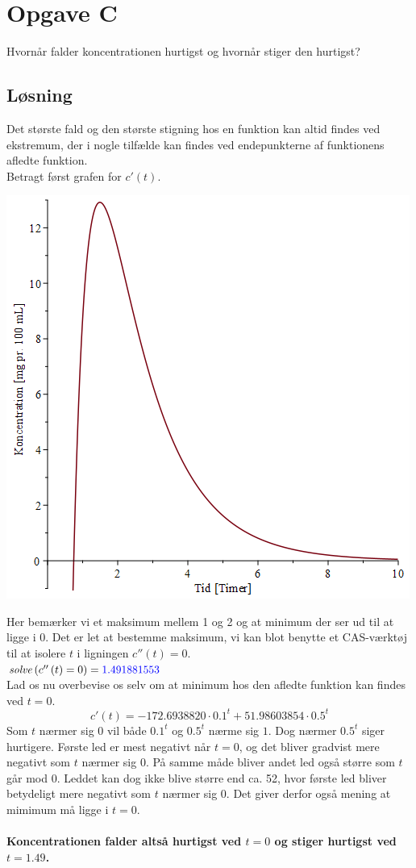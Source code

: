 \documentclass[a4paper, 11pt]{article}
\begin{document}
\section*{Opgave C} 
Hvornår falder koncentrationen hurtigst og hvornår stiger den hurtigst?
\subsection*{Løsning}
Det største fald og den største stigning hos en funktion kan altid findes ved ekstremum, der i nogle tilfælde kan findes ved endepunkterne af funktionens afledte funktion.\\
Betragt først grafen for \(c'(t)\).\\
\begin{center}
\includegraphics[width = 0.65 \textwidth]{AfledtGraf.png}
\end{center}
Her bemærker vi et maksimum mellem 1 og 2 og at minimum der ser ud til at ligge i 0. Det er let at bestemme maksimum, vi kan blot benytte et CAS-værktøj til at isolere \(t\) i ligningen \(c''(t)=0\).\\
\(\mathit{solve}\left(c''\left(t\right)=0\right)=\textcolor{blue}{1.491881553}\)\\
Lad os nu overbevise os selv om at minimum hos den afledte funktion kan findes ved \(t=0\). 
\[c'(t)=- 172.6938820 \cdot 0.1^{t}+ 51.98603854 \cdot 0.5^{t}\]
Som \(t\) nærmer sig \(0\) vil både \(0.1^t\) og \(0.5^t\) nærme sig \(1\). Dog nærmer \(0.5^t\) siger hurtigere. Første led er mest negativt når \(t=0\), og det bliver gradvist mere negativt som \(t\) nærmer sig 0. På samme måde bliver andet led også større som \(t\) går mod 0. Leddet kan dog ikke blive større end ca. 52, hvor første led bliver betydeligt mere negativt som \(t\) nærmer sig 0. Det giver derfor også mening at mimimum må ligge i \(t=0\).\\\\
\textbf{Koncentrationen falder altså hurtigst ved \(t=0\) og stiger hurtigst ved \(t=1.49\).}
\clearpage
\end{document}
